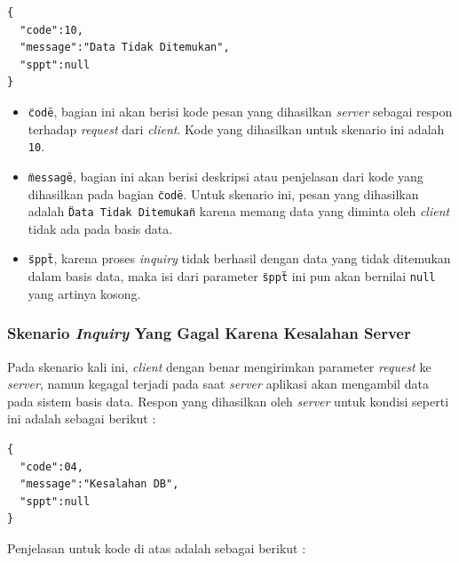\documentclass[pdftex,12pt, oneside]{article}
\begin{document}
  \begin{lstlisting}
{
  "code":10,
  "message":"Data Tidak Ditemukan",
  "sppt":null
}
  \end{lstlisting}
  
  \begin{itemize}
    \item \texttt{\"code\"}, bagian ini akan berisi kode pesan yang dihasilkan \textit{server} sebagai respon terhadap \textit{request} dari \textit{client}. Kode yang dihasilkan untuk skenario ini adalah \texttt{10}.
    
    \item \texttt{\"message\"}, bagian ini akan berisi deskripsi atau penjelasan dari kode yang dihasilkan pada bagian \texttt{\"code\"}. Untuk skenario ini, pesan yang dihasilkan adalah \texttt{\"Data Tidak Ditemukan\"} karena memang data yang diminta oleh \textit{client} tidak ada pada basis data.
    
    \item \texttt{\"sppt\"}, karena proses \textit{inquiry} tidak berhasil dengan data yang tidak ditemukan dalam basis data, maka isi dari parameter \texttt{\"sppt\"} ini pun akan bernilai \texttt{null} yang artinya kosong.
  \end{itemize}

\subsubsection{Skenario \textit{Inquiry} Yang Gagal Karena Kesalahan Server}

  Pada skenario kali ini, \textit{client} dengan benar mengirimkan parameter \textit{request} ke \textit{server}, namun kegagal terjadi pada saat \textit{server} aplikasi akan mengambil data pada sistem basis data. Respon yang dihasilkan oleh \textit{server} untuk kondisi seperti ini adalah sebagai berikut :
  
  \begin{lstlisting}
{
  "code":04,
  "message":"Kesalahan DB",
  "sppt":null
}
  \end{lstlisting}
  
  Penjelasan untuk kode di atas adalah sebagai berikut :
  
\end{document}
